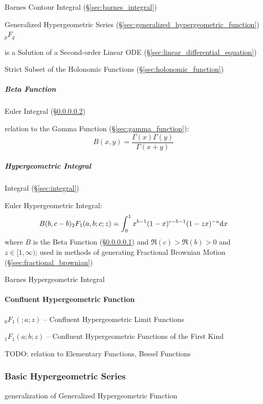 Barnes Contour Integral (\S\ref{sec:barnes_integral})

\fist Generalized Hypergeometric Series
(\S\ref{sec:generalized_hypergeometric_function})
$_pF_q$

is a Solution of a Second-order Linear ODE
(\S\ref{sec:linear_differential_equation})

Strict Subset of the Holonomic Functions (\S\ref{sec:holonomic_function})



\subparagraph{Beta Function}\label{sec:beta_function}\hfill

Euler Integral (\S\ref{sec:hypergeometric_integral})

relation to the Gamma Function (\S\ref{sec:gamma_function}):
\[
  B(x, y) = \frac{\Gamma(x)\Gamma(y)}{\Gamma(x + y)}
\]



\subparagraph{Hypergeometric Integral}\label{sec:hypergeometric_integral}\hfill

Integral (\S\ref{sec:integral})

Euler Hypergeometric Integral:
\[
  B(b, c-b) _2F_1 (a, b; c; z) =
    \int_0^1 x^{b-1}(1-x)^{c-b-1}(1 - zx)^{-a} \mathrm{d}x
\]
where $B$ is the Beta Function (\S\ref{sec:beta_function}) and
$\Re(c) > \Re(b) > 0$ and $z \in [1, \infty)$; used in methods of generating
  Fractional Brownian Motion (\S\ref{sec:fractional_brownian})

Barnes Hypergeometric Integral



\paragraph{Confluent Hypergeometric Function}
\label{sec:confluent_hypergeometric}\hfill

$_0F_1(; a; z)$ -- Confluent Hypergeometric Limit Functions

$_1F_1(a; b; z)$ -- Confluent Hypergeometric Functions of the First Kind

TODO: relation to Elementary Functions, Bessel Functions



\subsubsection{Basic Hypergeometric Series}\label{sec:basic_hypergeometric}

generalization of Generalized Hypergeometric Function



